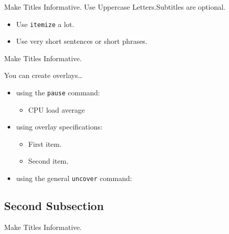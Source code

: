 \documentclass{beamer}
\begin{document}
\begin{frame}{Make Titles Informative. Use Uppercase Letters.}{Subtitles are optional.}

  \begin{itemize}
  \item
    Use \texttt{itemize} a lot.
  \item
    Use very short sentences or short phrases.
  \end{itemize}
\end{frame}

\begin{frame}{Make Titles Informative.}

  You can create overlays\dots
  \begin{itemize}

  \item using the \texttt{pause} command:
    \begin{itemize}
\item CPU load average

    \end{itemize}

  \item
    using overlay specifications:
    \begin{itemize}
    \item<3->
      First item.
    \item<4->
      Second item.
    \end{itemize}


  \item
    using the general \texttt{uncover} command:
    \begin{itemize}
    \end{itemize}

  \end{itemize}

\end{frame}



\subsection{Second Subsection}

\begin{frame}{Make Titles Informative.}
\end{frame}
\end{document}
